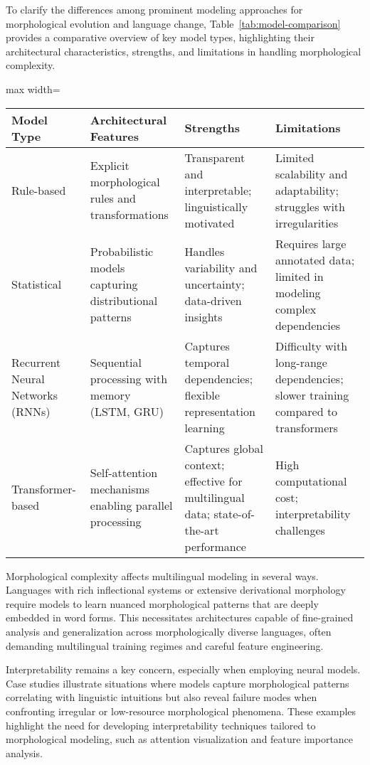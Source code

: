 \documentclass[sigconf]{acmart}
\begin{document}
To clarify the differences among prominent modeling approaches for morphological evolution and language change, Table~\ref{tab:model-comparison} provides a comparative overview of key model types, highlighting their architectural characteristics, strengths, and limitations in handling morphological complexity.

\begin{table*}[htbp]
\centering
\caption{Comparison of Modeling Approaches for Language Change and Morphological Evolution}
\label{tab:model-comparison}
\begin{adjustbox}{max width=\textwidth}
\begin{tabular}{@{}llll@{}}
\toprule
Model Type & Architectural Features & Strengths & Limitations \\ \midrule
Rule-based & Explicit morphological rules and transformations & Transparent and interpretable; linguistically motivated & Limited scalability and adaptability; struggles with irregularities \\
Statistical & Probabilistic models capturing distributional patterns & Handles variability and uncertainty; data-driven insights & Requires large annotated data; limited in modeling complex dependencies \\
Recurrent Neural Networks (RNNs) & Sequential processing with memory (LSTM, GRU) & Captures temporal dependencies; flexible representation learning & Difficulty with long-range dependencies; slower training compared to transformers \\
Transformer-based & Self-attention mechanisms enabling parallel processing & Captures global context; effective for multilingual data; state-of-the-art performance & High computational cost; interpretability challenges \\ \bottomrule
\end{tabular}
\end{adjustbox}
\end{table*}

Morphological complexity affects multilingual modeling in several ways. Languages with rich inflectional systems or extensive derivational morphology require models to learn nuanced morphological patterns that are deeply embedded in word forms. This necessitates architectures capable of fine-grained analysis and generalization across morphologically diverse languages, often demanding multilingual training regimes and careful feature engineering.

Interpretability remains a key concern, especially when employing neural models. Case studies illustrate situations where models capture morphological patterns correlating with linguistic intuitions but also reveal failure modes when confronting irregular or low-resource morphological phenomena. These examples highlight the need for developing interpretability techniques tailored to morphological modeling, such as attention visualization and feature importance analysis.
\end{document}
